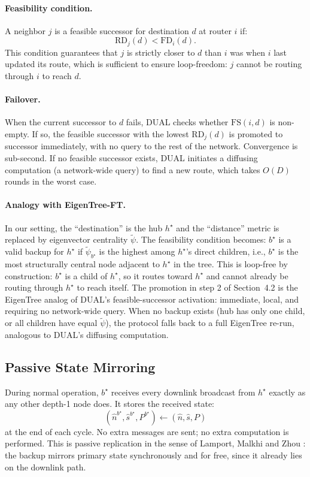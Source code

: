 \documentclass{article}
\newcommand{\merw}{EigenTree}
\newcommand{\merwft}{EigenTree-FT}
\begin{document}
\paragraph{Feasibility condition.} A neighbor $j$ is a feasible successor for destination
$d$ at router $i$ if:
\[
    \mathrm{RD}_j(d) < \mathrm{FD}_i(d).
\]
This condition guarantees that $j$ is strictly closer to $d$ than $i$ was when $i$ last
updated its route, which is sufficient to ensure loop-freedom: $j$ cannot be routing
through $i$ to reach $d$.

\paragraph{Failover.} When the current successor to $d$ fails, DUAL checks whether
$\mathrm{FS}(i, d)$ is non-empty. If so, the feasible successor with the lowest
$\mathrm{RD}_j(d)$ is promoted to successor immediately, with no query to the rest of
the network. Convergence is sub-second. If no feasible successor exists, DUAL initiates
a diffusing computation (a network-wide query) to find a new route, which takes $O(D)$
rounds in the worst case.

\paragraph{Analogy with \merwft.} In our setting, the ``destination'' is the hub
$h^\star$ and the ``distance'' metric is replaced by eigenvector centrality $\tilde{\psi}$.
The feasibility condition becomes: $b^\star$ is a valid backup for $h^\star$ if
$\tilde{\psi}_{b^\star}$ is the highest among $h^\star$'s direct children, i.e.,
$b^\star$ is the most structurally central node adjacent to $h^\star$ in the tree. This
is loop-free by construction: $b^\star$ is a child of $h^\star$, so it routes toward
$h^\star$ and cannot already be routing through $h^\star$ to reach itself. The promotion
in step 2 of Section~4.2 is the \merw{} analog of DUAL's feasible-successor activation:
immediate, local, and requiring no network-wide query. When no backup exists (hub has
only one child, or all children have equal $\tilde{\psi}$), the protocol falls back to a
full \merw{} re-run, analogous to DUAL's diffusing computation.

\subsection{Passive State Mirroring}

During normal operation, $b^\star$ receives every downlink broadcast from $h^\star$
exactly as any other depth-1 node does. It stores the received state:
\[
    (\hat{n}^{b^\star}, \hat{s}^{b^\star}, P^{b^\star}) \leftarrow (\hat{n}, \hat{s}, P)
\]
at the end of each cycle. No extra messages are sent; no extra computation is performed.
This is passive replication in the sense of Lamport, Malkhi and Zhou
\cite{lamport2009vertical}: the backup mirrors primary state synchronously and for free,
since it already lies on the downlink path.
\end{document}
